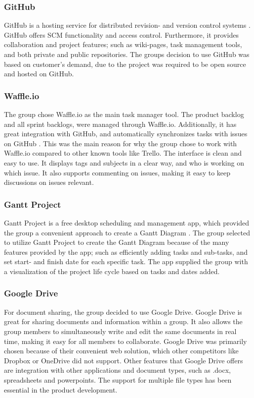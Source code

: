 \subsubsection{GitHub}
\label{GitHub}
GitHub is a hosting service for distributed revision- and version control systems \cite{GitHub}. GitHub offers SCM functionality and access control. Furthermore, it provides collaboration and project features; such as wiki-pages, task management tools, and both private and public repositories. The groups decision to use GitHub was based on customer's demand, due to the project was required to be open source and hosted on GitHub. 


\subsubsection{Waffle.io}
\label{Waffle.io}
The group chose Waffle.io as the main task manager tool. The product backlog and all sprint backlogs, were managed through Waffle.io. Additionally, it has great integration with GitHub, and automatically synchronizes tasks with issues on GitHub \cite{Waffle}. This was the main reason for why the group chose to work with Waffle.io compared to other known tools like Trello. The interface is clean and easy to use. It displays tags and subjects in a clear way, and who is working on which issue. It also supports commenting on issues, making it easy to keep discussions on issues relevant. 

\subsubsection{Gantt Project} \label{sss:Gant_Project} 
Gantt Project is a free desktop scheduling and management app, which provided the group a convenient approach to create a Gantt Diagram \cite{Gantt}. The group selected to utilize Gantt Project to create the Gantt Diagram because of the many features provided by the app; such as efficiently adding tasks and sub-tasks, and set start- and finish date for each specific task. The app supplied the group with a visualization of the project life cycle based on tasks and dates added.  


\subsubsection{Google Drive}
For document sharing, the group decided to use Google Drive. Google Drive is great for sharing documents and information within a group. It also allows the group members to simultaneously write and edit the same documents in real time, making it easy for all members to collaborate. Google Drive was primarily chosen because of their convenient web solution, which other competitors like Dropbox or OneDrive did not support. Other features that Google Drive offers are integration with other applications and document types, such as .docx, spreadsheets and powerpoints. The support for multiple file types has been essential in the product development.

